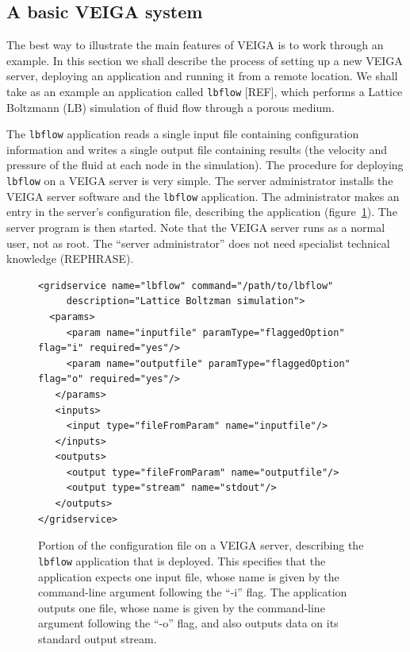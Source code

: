 \documentclass[a4paper]{article}
\begin{document}
\begin{multicols}{2}
\section{A basic VEIGA system}\label{sec:basicveiga}
The best way to illustrate the main features of VEIGA is to work through an example.  In this section we shall describe the process of setting up a new VEIGA server, deploying an application and running it from a remote location.  We shall take as an example an application called {\tt lbflow} [REF], which performs a Lattice Boltzmann (LB) simulation of fluid flow through a porous medium.

The {\tt lbflow} application reads a single input file containing configuration information and writes a single output file containing results (the velocity and pressure of the fluid at each node in the simulation).  The procedure for deploying {\tt lbflow} on a VEIGA server is very simple.  The server administrator installs the VEIGA server software and the {\tt lbflow} application.  The administrator makes an entry in the server's configuration file, describing the application (figure~\ref{fig:lbflowconfig}).  The server program is then started.  Note that the VEIGA server runs as a normal user, not as root.  The ``server administrator'' does not need specialist technical knowledge (REPHRASE).

\begin{figure}
\centering
\begin{verbatim}
<gridservice name="lbflow" command="/path/to/lbflow"
     description="Lattice Boltzman simulation">
  <params>
     <param name="inputfile" paramType="flaggedOption" flag="i" required="yes"/>
     <param name="outputfile" paramType="flaggedOption" flag="o" required="yes"/>
   </params>
   <inputs>
     <input type="fileFromParam" name="inputfile"/>
   </inputs>
   <outputs>
     <output type="fileFromParam" name="outputfile"/>
     <output type="stream" name="stdout"/>
   </outputs>
</gridservice>
\end{verbatim}
\caption{Portion of the configuration file on a VEIGA server, describing the {\tt lbflow} application that is deployed.  This specifies that the application expects one input file, whose name is given by the command-line argument following the ``-i'' flag.  The application outputs one file, whose name is given by the command-line argument following the ``-o'' flag, and also outputs data on its standard output stream.}
\label{fig:lbflowconfig}
\end{figure}


\end{multicols}
\end{document}
